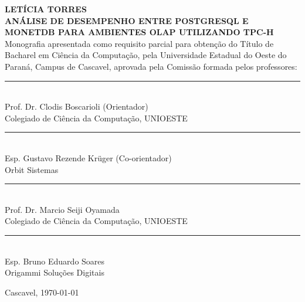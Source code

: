 

\begin{center}
\fontsize{12}{12}
\textbf{LETÍCIA TORRES}\\
\vspace{3cm}
\fontsize{14}{14}
\textbf{\MakeUppercase{Análise de Desempenho entre PostgreSQL e MonetDB para Ambientes OLAP Utilizando TPC-H}}\\
\vspace{3cm}
\fontsize{10}{10}
Monografia apresentada como requisito parcial para obtenção do Título de Bacharel em Ciência da Computação, pela Universidade Estadual do Oeste do Paraná, Campus de Cascavel, aprovada pela Comissão formada pelos professores:\\
\vspace{1.5cm}
\begin{flushright}
\begin{minipage}[10cm] {8.5cm}
\begin{center}
\rule{6cm}{0.01mm}\\
Prof. Dr. Clodis Boscarioli (Orientador)\\
Colegiado de Ciência da Computação, UNIOESTE\\
\vspace{1cm}
\rule{6cm}{0.01mm}\\
Esp. Gustavo Rezende Krüger (Co-orientador)\\
Orbit Sistemas\\
\vspace{1cm}
\rule{6cm}{0.01mm}\\
Prof. Dr. Marcio Seiji Oyamada\\
Colegiado de Ciência da Computação, UNIOESTE\\
\vspace{1cm}
\rule{6cm}{0.01mm}\\
Esp. Bruno Eduardo Soares\\
Origammi Soluções Digitais\\
\end{center}
\end{minipage}
\end{flushright}
\vspace{2cm}
Cascavel, \today
\end{center} 